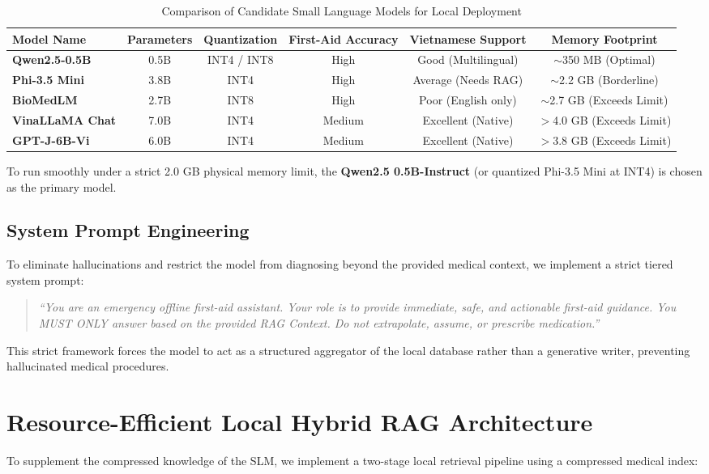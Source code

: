 \documentclass[journal,compsoc]{IEEEtran}
\begin{document}
\begin{table}[t]
\centering
\caption{Comparison of Candidate Small Language Models for Local Deployment}
\label{tab:models}
\begin{tabular}{lccccc}
\toprule
\textbf{Model Name} & \textbf{Parameters} & \textbf{Quantization} & \textbf{First-Aid Accuracy} & \textbf{Vietnamese Support} & \textbf{Memory Footprint} \\
\midrule
\textbf{Qwen2.5-0.5B} & 0.5B & INT4 / INT8 & High & Good (Multilingual) & $\sim$350 MB (Optimal) \\
\textbf{Phi-3.5 Mini} & 3.8B & INT4 & High & Average (Needs RAG) & $\sim$2.2 GB (Borderline) \\
\textbf{BioMedLM} & 2.7B & INT8 & High & Poor (English only) & $\sim$2.7 GB (Exceeds Limit) \\
\textbf{VinaLLaMA Chat} & 7.0B & INT4 & Medium & Excellent (Native) & $>$4.0 GB (Exceeds Limit) \\
\textbf{GPT-J-6B-Vi} & 6.0B & INT4 & Medium & Excellent (Native) & $>$3.8 GB (Exceeds Limit) \\
\bottomrule
\end{tabular}
\end{table}

To run smoothly under a strict 2.0 GB physical memory limit, the \textbf{Qwen2.5 0.5B-Instruct} (or quantized Phi-3.5 Mini at INT4) is chosen as the primary model.

\subsection{System Prompt Engineering}
To eliminate hallucinations and restrict the model from diagnosing beyond the provided medical context, we implement a strict tiered system prompt:
\begin{quote}
\textit{``You are an emergency offline first-aid assistant. Your role is to provide immediate, safe, and actionable first-aid guidance. You MUST ONLY answer based on the provided RAG Context. Do not extrapolate, assume, or prescribe medication.''}
\end{quote}

This strict framework forces the model to act as a structured aggregator of the local database rather than a generative writer, preventing hallucinated medical procedures.

\section{Resource-Efficient Local Hybrid RAG Architecture}
To supplement the compressed knowledge of the SLM, we implement a two-stage local retrieval pipeline using a compressed medical index:
\end{document}
